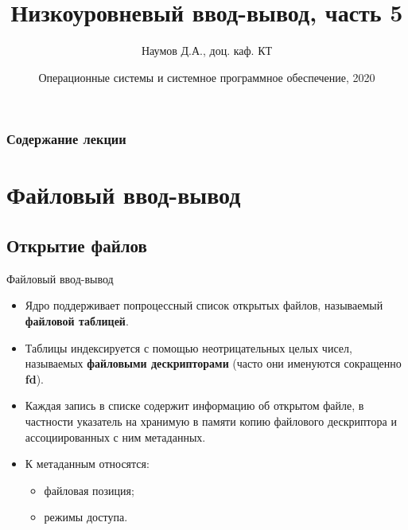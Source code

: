 \documentclass[xcolor=table]{beamer}
\title[Язык C]{Низкоуровневый ввод-вывод, часть 5}
\author{Наумов Д.А., доц. каф. КТ}
\date[14.10.2019] {Операционные системы и системное программное обеспечение, 2020}
\begin{document}
\begin{frame}
  \titlepage
\end{frame}
  
\begin{frame}
  \frametitle{Содержание лекции}
  \tableofcontents  
\end{frame}

\section{Файловый ввод-вывод}

\subsection{Открытие файлов}

\begin{frame}{Файловый ввод-вывод}
\begin{itemize}
\item Ядро поддерживает попроцессный список открытых файлов, называемый \textbf{файловой таблицей}. 
\item Таблицы индексируется с помощью неотрицательных целых чисел, называемых \textbf{файловыми дескрипторами} (часто они именуются сокращенно \textbf{fd}). 
\item Каждая запись в списке содержит информацию об открытом файле, в частности указатель на хранимую в памяти копию файлового дескриптора и ассоциированных с ним метаданных.
\item К метаданным относятся:
	\begin{itemize}
	\item файловая позиция;
	\item режимы доступа.
	\end{itemize}
\end{itemize}
\end{frame}
\end{document}
